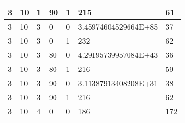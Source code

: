 \documentclass{article}
\theoremstyle{definition}
\begin{document}
\begin{table}[]
\begin{tabular}{|l|l|l|l|l|l|l|}
3                                      & 10                                      & 1                                      & 90                                   & 1                                      & 215                                      & 61                                     \\ \hline
3                                      & 10                                      & 3                                      & 0                                    & 0                                      & 3.45974604529664E+85                     & 37                                     \\ \hline
3                                      & 10                                      & 3                                      & 0                                    & 1                                      & 232                                      & 62                                     \\ \hline
3                                      & 10                                      & 3                                      & 80                                   & 0                                      & 4.29195739957084E+43                     & 36                                     \\ \hline
3                                      & 10                                      & 3                                      & 80                                   & 1                                      & 216                                      & 59                                     \\ \hline
3                                      & 10                                      & 3                                      & 90                                   & 0                                      & 3.11387913408208E+31                     & 38                                     \\ \hline
3                                      & 10                                      & 3                                      & 90                                   & 1                                      & 216                                      & 62                                     \\ \hline
3                                      & 10                                      & 4                                      & 0                                    & 0                                      & 186                                      & 172                                    \\ \hline

\end{tabular}
\end{table}
\end{document}
